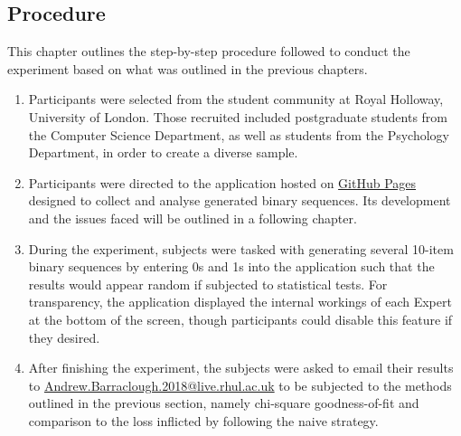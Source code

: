 \subsection{Procedure}
This chapter outlines the step-by-step procedure followed to conduct the experiment based on what was outlined in the previous chapters.
\begin{enumerate}
    \item Participants were selected from the student community at Royal Holloway, University of London. Those recruited included postgraduate students from the Computer Science Department, as well as students from the Psychology Department, in order to create a diverse sample.
    \item Participants were directed to the application hosted on \href{https://arbarraclough.github.io/aggregating_algorithm/}{GitHub Pages} designed to collect and analyse generated binary sequences. Its development and the issues faced will be outlined in a following chapter.
    \item During the experiment, subjects were tasked with generating several 10-item binary sequences by entering 0s and 1s into the application such that the results would appear random if subjected to statistical tests. For transparency, the application displayed the internal workings of each Expert at the bottom of the screen, though participants could disable this feature if they desired.
    \item After finishing the experiment, the subjects were asked to email their results to \href{mailto:Andrew.Barraclough.2018@live.rhul.ac.uk}{Andrew.Barraclough.2018@live.rhul.ac.uk} to be subjected to the methods outlined in the previous section, namely chi-square goodness-of-fit and comparison to the loss inflicted by following the naive strategy.
\end{enumerate}